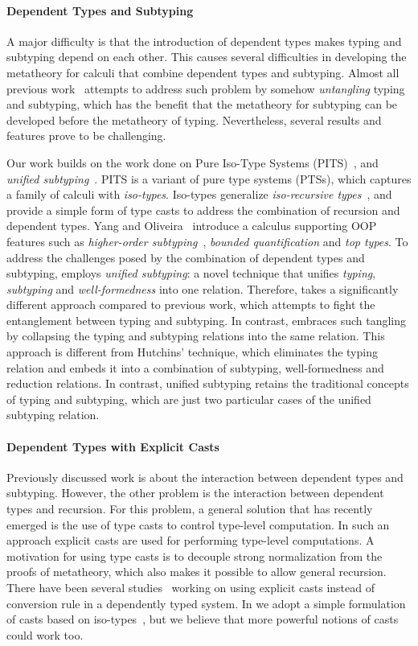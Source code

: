 \paragraph{Dependent Types and Subtyping}
A major difficulty is that the introduction of dependent
types makes typing and subtyping depend on each other. This causes
several difficulties in developing the metatheory for calculi that
combine dependent types and subtyping. Almost all previous
work~\cite{subdep,ptssub,chen1,cocsub,Chen03coc} attempts to address such problem by somehow
\emph{untangling} typing and subtyping, which has the benefit that the
metatheory for subtyping can be developed before the metatheory of
typing. Nevertheless, several results and features prove to be
challenging.

Our work builds on the work done on Pure Iso-Type Systems (PITS)~\cite{yang2019pure}, and
\emph{unified subtyping}~\cite{full}. PITS is a variant of pure type systems (PTSs),
which captures a family of calculi with \emph{iso-types}.
Iso-types generalize \emph{iso-recursive
types}~\cite{tapl}, and provide a simple form of
type casts to address the combination of recursion and
dependent types.
Yang and Oliveira~\cite{full} introduce a calculus supporting OOP features such as
\emph{higher-order subtyping}~\cite{fsubo}, \emph{bounded quantification} and
\emph{top types}.
To address the challenges posed by
the combination of dependent types and subtyping, \name
employs \emph{unified subtyping}: a novel technique that unifies
\emph{typing}, \emph{subtyping} and \emph{well-formedness} into one
relation. Therefore, \name takes a significantly different
approach compared to previous work, which
attempts to fight the entanglement between typing and subtyping. In
contrast, \name embraces such
tangling by collapsing the typing and subtyping
relations into the same relation. This approach is different from
Hutchins' technique, which eliminates the typing relation and embeds it into
a combination of subtyping, well-formedness and reduction relations.
In contrast, unified subtyping
retains the traditional concepts of typing and subtyping, which are just two
particular cases of the unified subtyping relation.

\paragraph{Dependent Types with Explicit Casts} Previously
discussed work is about the interaction between dependent types and
subtyping. However, the other problem is the
interaction between dependent types and recursion. For this
problem, a general solution that has recently emerged is the use
of type casts to control type-level computation. In such an approach explicit casts
are used for performing type-level computations. A motivation for
using type casts is to decouple strong normalization from the
proofs of metatheory, which also makes it possible to allow general
recursion. There have been several studies~\cite{guru,sjoberg:msfp12,
  kimmel:plpv, zombie:popl15, fc:kind, Doorn:2013hq,isotype} working
on using explicit casts instead of conversion rule in a dependently
typed system. In \name we adopt a simple formulation of casts based
on iso-types~\cite{isotype}, but we believe that more powerful notions
of casts could work too.
